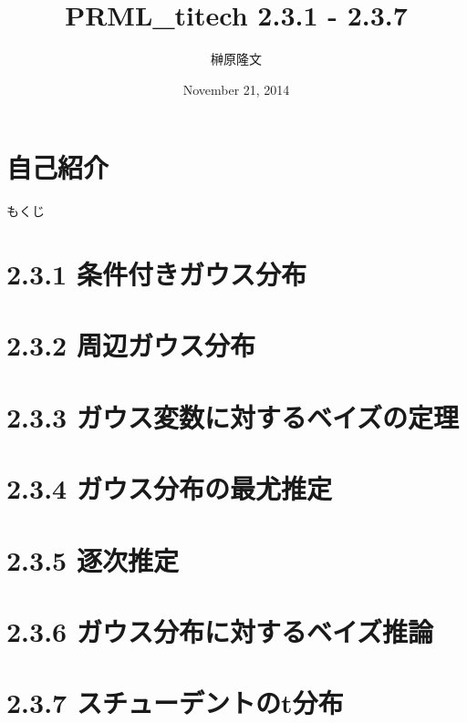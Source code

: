 \documentclass[dvipdfmx]{beamer}
\title{PRML\_titech 2.3.1 - 2.3.7}
\author{榊原隆文}
\date{November 21, 2014}
\begin{document}
\maketitle

\section*{自己紹介}


\begin{frame}{もくじ}
	\tableofcontents
\end{frame}

\section{2.3.1 条件付きガウス分布}


\section{2.3.2 周辺ガウス分布}


\section{2.3.3 ガウス変数に対するベイズの定理}


\section{2.3.4 ガウス分布の最尤推定}


\section{2.3.5 逐次推定}


\section{2.3.6 ガウス分布に対するベイズ推論}


\section{2.3.7 スチューデントのt分布}

\end{document}
